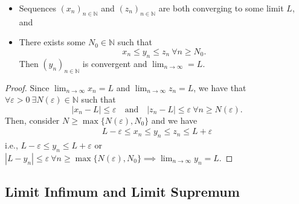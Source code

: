 \documentclass{article}
\newcommand{\N}{\mathbb{N}}
\newcommand{\seq}[2]{(#1_{#2})_{#2 \in \N}}
\newcommand{\mylim}[2]{\lim_{#1 \to #2}}
\newcommand{\?}{\stackrel{?}{=}}
\newcommand{\smallblacksquare}{\rule{0.5em}{0.5em}}
\theoremstyle{definition} %
\begin{document}
\begin{itemize}
\begin{theorem}
\begin{itemize}[label=\smallblacksquare]
                  \item Sequences $\seq{x}{n}$ and $\seq{z}{n}$ are both converging to some limit $L$, and
                  \item There exists some $N_0 \in \N$ such that
                        $$x_n \leq y_n \leq z_n \ \forall n \geq N_0.$$
                        Then $\seq{y}{n}$ is convergent and $\mylim{n}{\infty} = L$.
              \end{itemize}
              \label{thm:squeeze}
          \end{theorem}
          \begin{proof}
              Since $\mylim{n}{\infty} x_n = L$ and $\mylim{n}{\infty} z_n = L$, we have that $\forall \varepsilon > 0 \ \exists N(\varepsilon) \in \N$ such that
              $$|x_n - L| \leq \varepsilon \quad \text{and} \quad |z_n - L| \leq \varepsilon \ \forall n \geq N(\varepsilon).$$
              Then, consider $N \geq \max\{N(\varepsilon), N_0\}$ and we have
              \begin{align*}
                  L - \varepsilon \leq x_n \leq y_n \leq z_n \leq L + \varepsilon
              \end{align*}
              i.e., $L - \varepsilon \leq y_n \leq L + \varepsilon$ or $|L - y_n| \leq \varepsilon \ \forall n \geq \max\{N(\varepsilon), N_0\} \implies \mylim{n}{\infty} y_n = L$.
          \end{proof}
\end{itemize}

\subsection{Limit Infimum and Limit Supremum}
\end{document}
